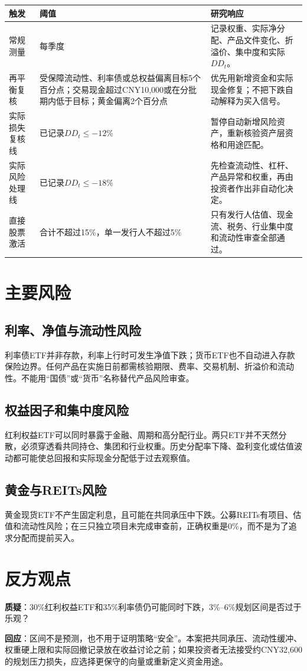 \begin{exhibitbox}[控制线]
\small
\begin{tabularx}{\exhibitboxwidth}{L{3cm}P P}
\toprule
\textbf{触发} & \textbf{阈值} & \textbf{研究响应} \\
\midrule
常规测量 & 每季度 & 记录权重、实际净分配、产品文件变化、折溢价、集中度和实际$DD_t$。 \\
再平衡复核 & 受保障流动性、利率债或总权益偏离目标5个百分点；交易现金超过CNY10,000或在分批期内低于目标；黄金偏离2个百分点 & 优先用新增资金和实际现金修复；不把下跌自动解释为买入信号。 \\
实际损失复核线 & 已记录$DD_t\leq-12\%$ & 暂停自动新增风险资产，重新核验资产层资格和用途匹配。 \\
实际风险处理线 & 已记录$DD_t\leq-18\%$ & 先检查流动性、杠杆、产品异常和权重，再由投资者作出非自动化决定。 \\
直接股票激活 & 合计不超过15\%，单一发行人不超过5\% & 只有发行人估值、现金流、税务、行业集中度和流动性审查全部通过。 \\
\bottomrule
\end{tabularx}
\end{exhibitbox}

\section{主要风险}

\subsection{利率、净值与流动性风险}

利率债ETF并非存款，利率上行时可发生净值下跌；货币ETF也不自动进入存款保险边界。任何产品在实施日前都需核验期限、费率、交易机制、折溢价和流动性。不能用“国债”或“货币”名称替代产品风险审查。

\subsection{权益因子和集中度风险}

红利权益ETF可以同时暴露于金融、周期和高分配行业。两只ETF并不天然分散，必须穿透看共同持仓、集团和行业权重。历史分配率下降、盈利变化或估值波动都可能使总回报和实际现金分配低于过去观察值。

\subsection{黄金与REITs风险}

黄金现货ETF不产生固定利息，且可能在共同承压中下跌。公募REITs有项目、估值和流动性风险；在三只独立项目未完成审查前，正确权重是0\%，而不是为了追求分配而提前买入。

\section{反方观点}

\textbf{质疑}：30\%红利权益ETF和35\%利率债仍可能同时下跌，3\%--6\%规划区间是否过于乐观？

\textbf{回应}：区间不是预测，也不用于证明策略“安全”。本案把共同承压、流动性缓冲、权重硬上限和实际回撤记录放在收益讨论之前；如果投资者无法接受约CNY32,600的规划压力损失，应选择更保守的向量或重新定义资金用途。
